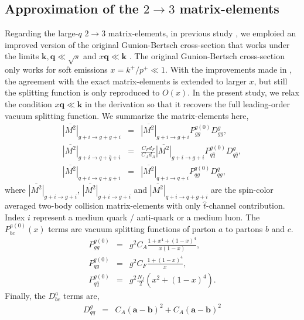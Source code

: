 \documentclass[aps, prc, reprint, amsmath, groupedaddress, nofootinbib]{revtex4-1}
\begin{document}
\begin{appendices}
\section{Approximation of the $2\rightarrow 3$ matrix-elements}
\label{app:23}
Regarding the large-$q$ $2\rightarrow 3$ matrix-elements, in previous study \cite{Ke:2018tsh}, we emploied an improved version of the original Gunion-Bertsch cross-section that works under the limits $\mathbf{k}, \mathbf{q} \ll \sqrt{s}$ and $x \mathbf{q} \ll \mathbf{k}$ \cite{PhysRevD.25.746,Fochler:2013epa,Uphoff:2014hza}.
The original Gunion-Bertsch cross-section \cite{PhysRevD.25.746} only works for soft emissions $x=k^+/p^+ \ll 1$. 
With the improvements made in \cite{Fochler:2013epa,Uphoff:2014hza}, the agreement with the exact matrix-elements is extended to larger $x$, but still the splitting function is only reproduced to $O(x)$.
In the present study, we relax the condition $x \mathbf{q} \ll \mathbf{k}$ in the derivation so that it recovers the full leading-order vacuum splitting function.
We summarize the matrix-elements here,
\begin{eqnarray}
\overline{|M^2|}_{g+i\rightarrow g+g+i} &=& \overline{|M^2|}_{g+i\rightarrow g+i} P_{gg}^{g(0)}  D_{gg}^{g},\\
\overline{|M^2|}_{g+i\rightarrow q+\bar{q}+i} &=& \frac{C_F d_F}{C_A d_A}\overline{|M^2|}_{g+i\rightarrow g+i} P_{q\bar{q}}^{g(0)} D_{q\bar{q}}^{g},\\
\overline{|M^2|}_{q+i\rightarrow q+g+i} &=& \overline{|M^2|}_{q+i\rightarrow q+i} P_{qg}^{q(0)} D_{qg}^{q},
\end{eqnarray}
where $\overline{|M^2|}_{g+i\rightarrow g+i}$, $\overline{|M^2|}_{g+i\rightarrow g+i}$ and $\overline{|M^2|}_{q+i\rightarrow q+g+i}$ are the spin-color averaged two-body collision matrix-elements with only $\hat{t}$-channel contribution.
Index $i$ represent a medium quark / anti-quark or a medium luon.
The $P_{bc}^{a(0)}(x)$ terms are vacuum splitting functions of parton $a$ to partons $b$ and $c$. 
\begin{eqnarray}
P_{gg}^{g(0)}  &=& g^2  C_A\frac{1+x^4+(1-x)^4}{x(1-x)},\\
P_{qg}^{q(0)} &=& g^2  C_F\frac{1+(1-x)^4}{x},\\
P_{q\bar{q}}^{g(0)} &=& g^2  \frac{N_f}{2}\left(x^2+(1-x)^4\right).
\end{eqnarray}
Finally, the $D_{bc}^{a}$ terms are,
\begin{eqnarray}
D_{qq}^{g} &=& 
C_A(\mathbf{a}-\mathbf{b})^2 + C_A(\mathbf{a}-\mathbf{b})^2 \\\nonumber

\end{eqnarray}
\end{appendices}
\end{document}
